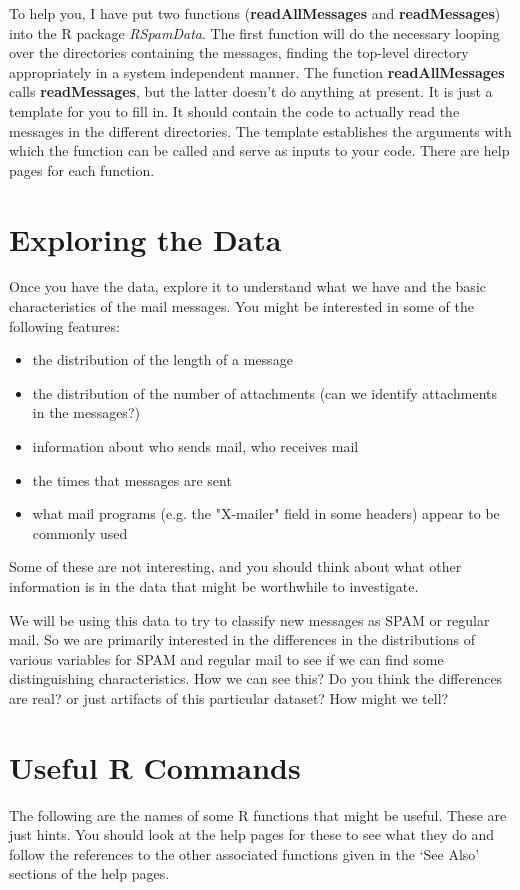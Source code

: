 \documentclass[10pt]{article}
\def\SPAM{SPAM}
\def\SFunctionRef#1{\textbf{#1}}
\def\Rpackage#1{\textit{#1}}
\begin{document}
To help you, I have put two functions (\SFunctionRef{readAllMessages}
and \SFunctionRef{readMessages}) into the  R package \Rpackage{RSpamData}.  The first function will do
the necessary looping over the directories containing the messages,
finding the top-level directory appropriately in a system independent
manner.  The function \SFunctionRef{readAllMessages} calls
\SFunctionRef{readMessages}, but the latter doesn't do anything at
present. It is just a template for you to fill in. It should contain the code to actually
read the messages in the different directories. The template establishes the
arguments with which the function can be called and serve as inputs to your
code.  There are help pages for each function.


\section{Exploring the Data}

Once you have the data, explore it to understand what we have and the
basic characteristics of the mail messages.  You might be interested
in some of the following features:
\begin{itemize}
\item 
   the distribution of the length of a message
\item
   the distribution of the number of attachments
  (can we identify attachments in the messages?)
\item
   information about who sends mail, who receives mail
\item
   the times that messages are sent
\item
  what mail programs (e.g. the "X-mailer" field in some headers)
  appear to be commonly used 
\end{itemize}
Some of these are not interesting,
and you should think about what other information
is in the data that might be worthwhile to investigate.

We will be using this data to try to classify new messages as \SPAM{}
or regular mail. So we are primarily interested in the differences in
the distributions of various variables for \SPAM{} and regular mail to
see if we can find some distinguishing characteristics.  How we can
see this? Do you think the differences are real? or just artifacts of
this particular dataset?   How might we tell?




\section{Useful R Commands}
The following are the names of some R functions that might be useful.
These are just hints. You should look at the help pages for these to
see what they do and follow the references to the other associated
functions given in the `See Also' sections of the help pages.
\end{document}
